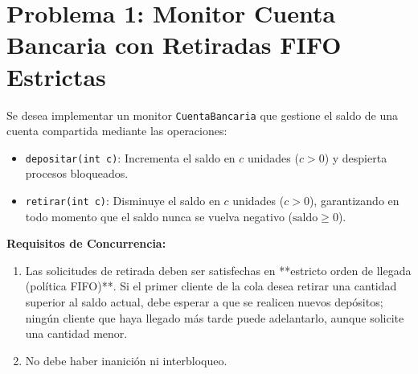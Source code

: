 \documentclass[11pt,a4paper,twoside,openright]{report}
\begin{document}
\section{Problema 1: Monitor Cuenta Bancaria con Retiradas FIFO Estrictas}

\begin{ejercicio}
Se desea implementar un monitor \texttt{CuentaBancaria} que gestione el saldo de una cuenta compartida mediante las operaciones:
\begin{itemize}
    \item \texttt{depositar(int c)}: Incrementa el saldo en $c$ unidades ($c > 0$) y despierta procesos bloqueados.
    \item \texttt{retirar(int c)}: Disminuye el saldo en $c$ unidades ($c > 0$), garantizando en todo momento que el saldo nunca se vuelva negativo ($\text{saldo} \ge 0$).
\end{itemize}
\textbf{Requisitos de Concurrencia:}
\begin{enumerate}
    \item Las solicitudes de retirada deben ser satisfechas en **estricto orden de llegada (política FIFO)**. Si el primer cliente de la cola desea retirar una cantidad superior al saldo actual, debe esperar a que se realicen nuevos depósitos; ningún cliente que haya llegado más tarde puede adelantarlo, aunque solicite una cantidad menor.
    \item No debe haber inanición ni interbloqueo.
\end{enumerate}
\end{ejercicio}
\end{document}
